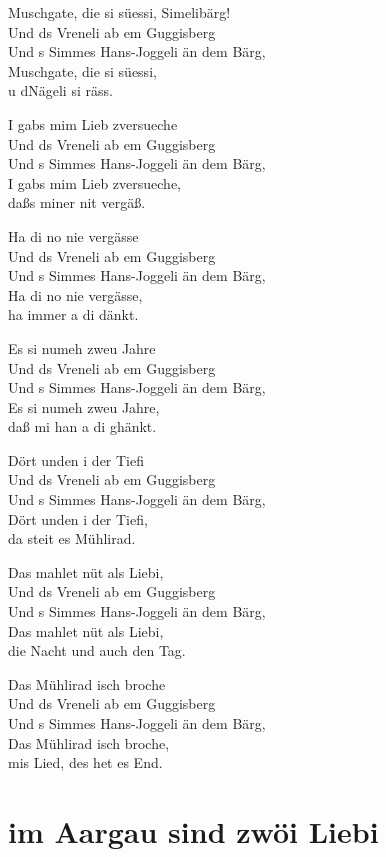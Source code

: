 \documentclass[
  letterpaper,
  a5paper]{memoir}
\begin{document}
Muschgate, die si süessi, Simelibärg!\\
Und ds Vreneli ab em Guggisberg\\
Und s Simmes Hans-Joggeli än dem Bärg,\\
Muschgate, die si süessi,\\
u d\textquotesingle Nägeli si räss.

I gabs mim Lieb z\textquotesingle versueche\\
Und ds Vreneli ab em Guggisberg\\
Und s Simmes Hans-Joggeli än dem Bärg,\\
I gabs mim Lieb z\textquotesingle versueche,\\
daßs miner nit vergäß.

Ha di no nie vergässe\\
Und ds Vreneli ab em Guggisberg\\
Und s Simmes Hans-Joggeli än dem Bärg,\\
Ha di no nie vergässe,\\
ha immer a di dänkt.

Es si numeh zweu Jahre\\
Und ds Vreneli ab em Guggisberg\\
Und s Simmes Hans-Joggeli än dem Bärg,\\
Es si numeh zweu Jahre,\\
daß mi han a di ghänkt.

Dört unden i der Tiefi\\
Und ds Vreneli ab em Guggisberg\\
Und s Simmes Hans-Joggeli än dem Bärg,\\
Dört unden i der Tiefi,\\
da steit es Mühlirad.

Das mahlet nüt als Liebi,\\
Und ds Vreneli ab em Guggisberg\\
Und s Simmes Hans-Joggeli än dem Bärg,\\
Das mahlet nüt als Liebi,\\
die Nacht und auch den Tag.

Das Mühlirad isch broche\\
Und ds Vreneli ab em Guggisberg\\
Und s Simmes Hans-Joggeli än dem Bärg,\\
Das Mühlirad isch broche,\\
mis Lied, des het es End.

\hypertarget{im-aargau-sind-zwuxf6i-liebi}{%
\chapter{im Aargau sind zwöi Liebi}\label{im-aargau-sind-zwuxf6i-liebi}}
\end{document}
